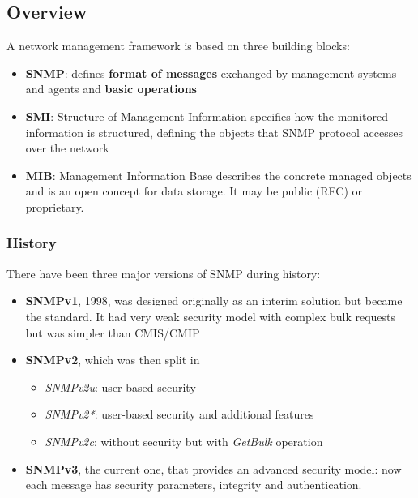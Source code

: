 \subsection{Overview}
A network management framework is based on three building blocks:
\begin{itemize}
	\item \textbf{SNMP}: defines \textbf{format of messages} exchanged by management systems and agents and \textbf{basic operations}
	\item \textbf{SMI}: Structure of Management Information specifies how the monitored information is structured, defining the objects that SNMP protocol accesses over the network
	\item \textbf{MIB}: Management Information Base describes the concrete managed objects and is an open concept for data storage. It may be public (RFC) or proprietary.
\end{itemize}

\subsubsection{History}
There have been three major versions of SNMP during history:
\begin{itemize}
	\item \textbf{SNMPv1}, 1998, was designed originally as an interim solution but became the standard. It had very weak security model with complex bulk requests but was simpler than CMIS/CMIP
	\item \textbf{SNMPv2}, which was then split in
	\begin{itemize}
		\item \textit{SNMPv2u}: user-based security
		\item \textit{SNMPv2*}: user-based security and additional features
		\item \textit{SNMPv2c}: without security but with \textit{GetBulk} operation
	\end{itemize}
	\item \textbf{SNMPv3}, the current one, that provides an advanced security model: now each message has security parameters, integrity and authentication.
\end{itemize}

